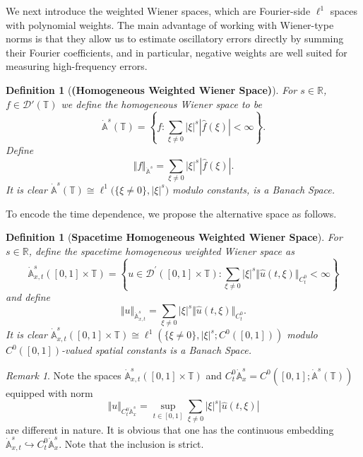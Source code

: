 \documentclass[12pt,reqno,letterpaper]{amsart}
\numberwithin{equation}{section}
\newcommand{\1}{{\bf 1}}
\newcommand{\2}{{\bf 2}}
\newcommand{\A}{\mathbb A}
\newcommand{\R}{\mathbb R}
\newcommand{\T}{\mathbb T}
\newcommand{\norm}[1]{ \Vert #1 \Vert}
\newtheorem{definition}[theorem]{Definition}
\theoremstyle{remark}
\newtheorem{remark}[theorem]{Remark}
\theoremstyle{remark}
\begin{document}
We next introduce the weighted Wiener spaces, which are Fourier-side \(\ell^1\) spaces with polynomial
weights.  The main advantage of working with Wiener-type norms is that they
allow us to estimate oscillatory errors directly by summing their Fourier
coefficients, and in particular, negative weights are well suited for measuring
high-frequency errors.


\begin{definition}[\textbf{(Homogeneous Weighted Wiener Space)}] For $s\in \R$, $f \in \mathcal{D}'(\T)$ we define the \textit{homogeneous Wiener space} to be
$$
\dot{\mathbb{A}}^s(\T) = \left\{f : \sum_{\xi \not = 0} |\xi|^{s}|\hat{f}(\xi)| < \infty\right\}.
$$
Define 
\[\norm{f}_{\dot{\A}^{s}} = \sum_{\xi \neq 0} |\xi|^s |\hat{f}(\xi)|.\]
It is clear $\dot{\A}^s(\T) \cong
\ell^1\bigl(\{\xi\neq 0\}, |\xi|^s\bigr)$ modulo constants, is a Banach Space.
\end{definition}



To encode the time dependence, we propose the alternative space as follows.

\begin{definition}[\textbf{Spacetime Homogeneous Weighted Wiener Space}]
    For $s \in \R$, define the spacetime homogeneous weighted Wiener space as 
    $$
\dot{\mathbb{A}}_{x,t}^{s}([0,1] \times \T) = \left\{u \in \mathcal{D}^\prime([0, 1] \times \T) :  \sum_{\xi \not =0} |\xi|^s \Vert \hat{u}(t,\xi) \Vert_{C_t^0} < \infty\right\}
$$ and define 
\[\norm{u}_{\dot{\mathbb{A}}_{x,t}^{s}} = \sum_{\xi \neq 0} |\xi|^s \Vert \hat{u}(t,\xi) \Vert_{C_t^0}.\]
It is clear $\dot{\mathbb{A}}_{x,t}^{s}([0,1] \times \T)  \cong \ell^1(\{\xi\neq 0\}, |\xi|^s; C^0([0, 1]))$ modulo $C^0([0, 1])$-valued spatial constants is a Banach Space.
\end{definition}




\begin{remark}
    Note the spaces $\dot{\mathbb{A}}_{x,t}^{s}([0,1] \times \T)$ and $C_t^0\dot{\A}_x^s = C^0([0, 1] ; \dot{\A}^{s}(\T))$ equipped with norm 
    \[\norm{u}_{C_t^0 \dot{\A}_x^s} = \underset{t \in [0, 1]}{\sup} \sum_{\xi \neq 0} |\xi|^s |\hat{u}(t,\xi)|  \] are different in nature. It is obvious that one has the continuous embedding $\dot{\mathbb{A}}_{x,t}^{s} \hookrightarrow C_t^0\dot{\A}_x^s$. Note that the inclusion is strict.
\end{remark}
\end{document}

